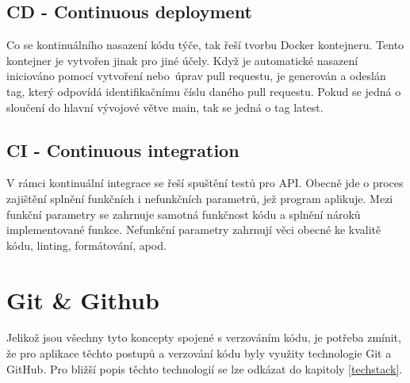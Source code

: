 \subsection{CD - Continuous deployment}
Co se kontinuálního nasazení kódu týče, tak řeší tvorbu Docker kontejneru. Tento kontejner je vytvořen jinak pro jiné účely. Když je automatické nasazení iniciováno pomocí vytvoření nebo~úprav pull requestu, je generován a odeslán tag, který odpovídá identifikačnímu číslu daného pull requestu. Pokud se jedná o sloučení do hlavní vývojové větve main, tak se jedná o tag latest.

\subsection{CI - Continuous integration}
V rámci kontinuální integrace se řeší spuštění testů pro API. Obecně jde o proces zajištění splnění funkčních i nefunkčních parametrů, jež program aplikuje. Mezi funkční parametry se zahrnuje samotná funkčnost kódu a splnění nároků implementované funkce. Nefunkční parametry zahrnují věci obecné ke kvalitě kódu, linting, formátování, apod.

\section{Git \& Github}
Jelikož jsou všechny tyto koncepty spojené s verzováním kódu, je potřeba zmínit, že pro aplikace těchto postupů a verzování kódu byly využity technologie Git a GitHub. Pro bližší popis těchto technologií se lze odkázat do kapitoly \ref{techstack}.
